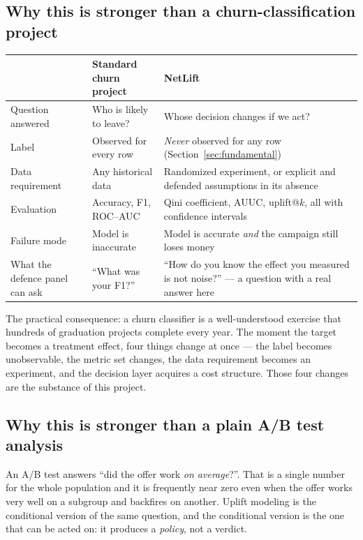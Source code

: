 \documentclass[11pt,a4paper]{article}
\begin{document}
\subsection{Why this is stronger than a churn-classification project}

\begin{tabularx}{\textwidth}{@{}L{4.4cm}XX@{}}
\toprule
& \textbf{Standard churn project} & \textbf{NetLift} \\
\midrule
Question answered & Who is likely to leave? & Whose decision changes if we act? \\
Label & Observed for every row & \emph{Never} observed for any row (Section~\ref{sec:fundamental}) \\
Data requirement & Any historical data & Randomized experiment, or explicit and defended
assumptions in its absence \\
Evaluation & Accuracy, F1, ROC--AUC & Qini coefficient, AUUC, uplift@$k$, all with confidence
intervals \\
Failure mode & Model is inaccurate & Model is accurate \emph{and} the campaign still loses money \\
What the defence panel can ask & ``What was your F1?'' & ``How do you know the effect you measured
is not noise?'' --- a question with a real answer here \\
\bottomrule
\end{tabularx}

The practical consequence: a churn classifier is a well-understood exercise that hundreds of
graduation projects complete every year. The moment the target becomes a treatment effect, four
things change at once --- the label becomes unobservable, the metric set changes, the data
requirement becomes an experiment, and the decision layer acquires a cost structure. Those four
changes are the substance of this project.

\subsection{Why this is stronger than a plain A/B test analysis}

An A/B test answers ``did the offer work \emph{on average}?''. That is a single number for the
whole population and it is frequently near zero even when the offer works very well on a subgroup
and backfires on another. Uplift modeling is the conditional version of the same question, and the
conditional version is the one that can be acted on: it produces a \emph{policy}, not a verdict.
\end{document}
